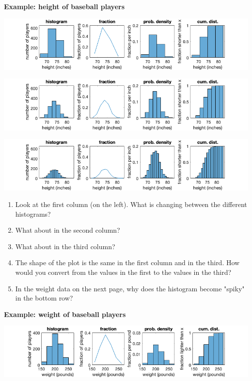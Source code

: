 \documentclass[12pt,letterpaper,noanswers]{exam}
\begin{document}
\eject

\noindent\textbf{Example: height of baseball players}

\includegraphics[width=\textwidth]{img/C14histbox4.png}

\includegraphics[width=\textwidth]{img/C14histbox2.png}

\includegraphics[width=\textwidth]{img/C14histbox1.png}


\begin{enumerate}
    \item Look at the first column (on the left).  What is changing between the different histograms? %
    \item What about in the second column?
    \item What about in the third column?
    \item The shape of the plot is the same in the first column and in the third.  How would you convert from the values in the first to the values in the third?
    \item In the weight data on the next page, why does the histogram become "spiky" in the bottom row?
\end{enumerate}

\eject

\noindent\textbf{Example: weight of baseball players}

\includegraphics[width=\textwidth]{img/C14histboxweight20.png}
\end{document}
